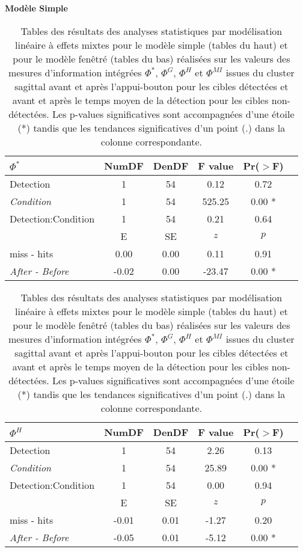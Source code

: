 \begin{table}
\centering
\scriptsize
\caption[Table des résultats des analyses statistiques pour les mesures de la TII du cluster sagittal]{Tables des résultats des analyses statistiques par modélisation linéaire à effets mixtes pour le modèle simple (tables du haut) et pour le modèle fenêtré (tables du bas) réalisées sur les valeurs des mesures d'information intégrées $\Phi^{*}$, $\Phi^{G}$, $\Phi^{H}$ et $\Phi^{MI}$ issues du cluster sagittal avant et après l'appui-bouton pour les cibles détectées et avant et après le temps moyen de la détection pour les cibles non-détectées. Les p-values significatives sont accompagnées d'une étoile (*) tandis que les tendances significatives d'un point (.) dans la colonne correspondante.}
\label{tab:table5statsmesuresIITclustersagittal}

\textbf{Modèle Simple}

\begin{multicols}{2}

\begin{tabular}{|l|*{5}{c|}}
\hline
\textbf{$\Phi^{*}$} & \textbf{NumDF} & \textbf{DenDF} & \textbf{F value} & \textbf{Pr($>$F)} \\ 
\hline
Detection & 1 & 54 & 0.12 & 0.72 \\ 
\textit{Condition} & 1 & 54 & 525.25 & 0.00 * \\ 
Detection:Condition & 1 & 54 & 0.21 & 0.64 \\ 
\hline
& E & SE & $z$ & $p$ \\
\hline
miss - hits & 0.00 & 0.00 & 0.11 & 0.91 \\ 
\hline
\textit{After - Before} & -0.02 & 0.00 & -23.47 & 0.00 * \\ 
\hline
\end{tabular}

\vspace{0.5cm}

\begin{tabular}{|l|*{5}{c|}}
\hline
\textbf{$\Phi^{H}$} & \textbf{NumDF} & \textbf{DenDF} & \textbf{F value} & \textbf{Pr($>$F)} \\ 
\hline
Detection & 1 & 54 & 2.26 & 0.13 \\ 
\textit{Condition} & 1 & 54 & 25.89 & 0.00 * \\ 
Detection:Condition & 1 & 54 & 0.00 & 0.94 \\ 
\hline
& E & SE & $z$ & $p$ \\
\hline
miss - hits & -0.01 & 0.01 & -1.27 & 0.20 \\ 
\hline
\textit{After - Before} & -0.05 & 0.01 & -5.12 & 0.00 * \\ 
\hline
\end{tabular}


\end{multicols}
\end{table}
